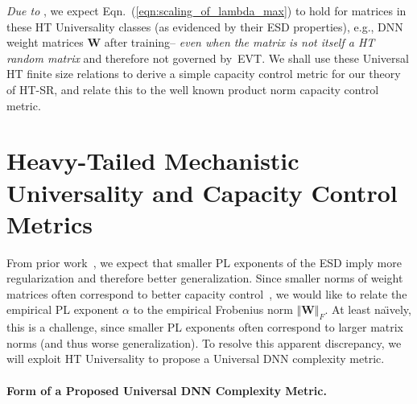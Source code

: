  \emph{Due to }, we expect Eqn.~(\ref{eqn:scaling_of_lambda_max}) to hold for matrices 
 in these HT Universality classes (as evidenced by their ESD properties), e.g., DNN weight matrices $\mathbf{W}$ after training--
  \emph{even when the matrix is not itself a HT random matrix} and therefore not governed by~EVT.
We shall use these Universal HT finite size relations to derive a simple capacity control metric for our
 theory of HT-SR, and relate this to the well known product norm capacity control metric.


\section{Heavy-Tailed Mechanistic Universality and Capacity Control Metrics}
\label{sxn:theory-new}





%
From prior work~\cite{MM18_TR}, we expect that smaller PL exponents of the ESD imply more regularization and therefore better generalization. 
Since smaller norms of weight matrices often correspond to better capacity control~\cite{LMBx18_TR,SHNx17_TR,PLMx18_TR,BFT17_TR}, we would like to relate the empirical PL exponent $\alpha$ to the empirical Frobenius norm $\Vert\mathbf{W}\Vert_{F}$.
At least na\"{\i}vely, this is a challenge, since smaller PL exponents often correspond to larger matrix norms (and thus worse generalization).
To resolve this apparent discrepancy, we will exploit HT Universality to propose a Universal DNN complexity metric.


\paragraph{Form of a Proposed Universal DNN Complexity Metric.} 

